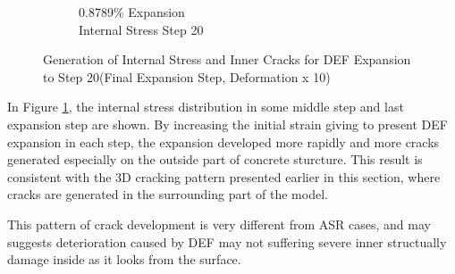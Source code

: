 \begin{figure}[h!]
\begin{subfigure}{.25\textwidth}
      \caption{0.8789\% Expansion\\Internal Stress Step 20}
    \end{subfigure}

    

\caption{Generation of Internal Stress and Inner Cracks for DEF Expansion to Step 20(Final Expansion Step, Deformation x 10)}
\label{fig:A30_X0C_stress}
\end{figure}

In Figure \ref{fig:A30_X0C_stress}, the internal stress distribution in some middle step and last expansion step are shown. By increasing the initial strain giving to present DEF expansion in each step, the expansion developed more rapidly and more cracks generated especially on the outside part of concrete sturcture. This result is consistent with the 3D cracking pattern presented earlier in this section, where cracks are generated in the surrounding part of the model.

This pattern of crack development is very different from ASR cases, and may suggests deterioration caused by DEF  may not suffering severe inner structually damage inside as it looks from the surface.
